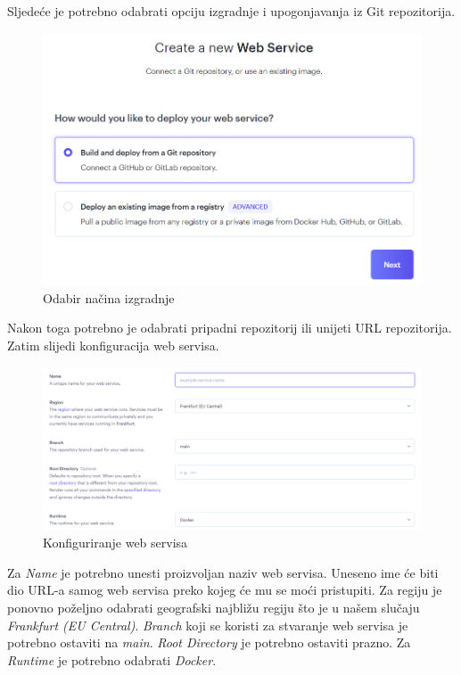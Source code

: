 			Sljedeće je potrebno odabrati opciju izgradnje i upogonjavanja iz Git repozitorija.
			
			\begin{figure}[H]
				\includegraphics[width=\textwidth]{slike/upute/odabirIzvoraIzgradnje.png} %
				\caption{Odabir načina izgradnje}
				\label{fig:odabirIzvoraIzgradnje} %
			\end{figure}
			
			Nakon toga potrebno je odabrati pripadni repozitorij ili unijeti URL repozitorija. Zatim slijedi konfiguracija web servisa.
			
			\begin{figure}[H]
				\includegraphics[width=\textwidth]{slike/upute/konfiguriranjeWebServisa.png} %
				\caption{Konfiguriranje web servisa}
				\label{fig:konfiguriranjeWebServisa} %
			\end{figure}
			
			Za \textit{Name} je potrebno unesti proizvoljan naziv web servisa. Uneseno ime će biti dio URL-a samog web servisa preko kojeg će mu se moći pristupiti. Za regiju je ponovno poželjno odabrati geografski najbližu regiju što je u našem slučaju \textit{Frankfurt (EU Central)}. \textit{Branch} koji se koristi za stvaranje web servisa je potrebno ostaviti na \textit{main}. \textit{Root Directory} je potrebno ostaviti prazno. Za \textit{Runtime} je potrebno odabrati \textit{Docker}.
			
